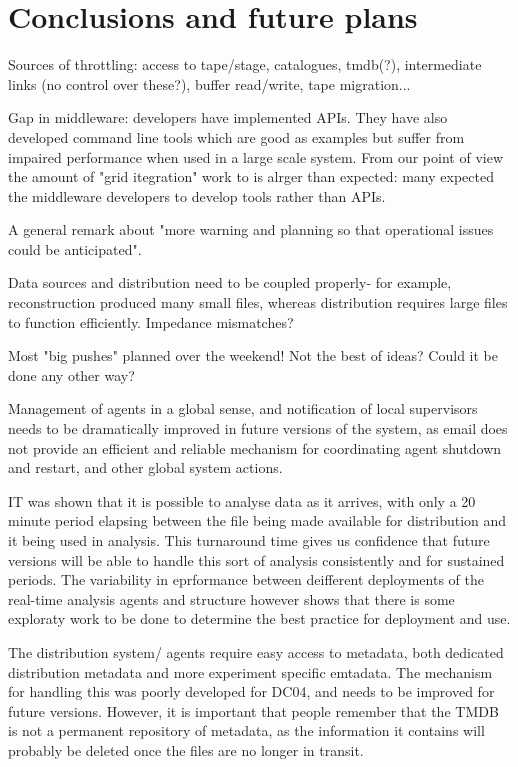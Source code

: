 \documentclass{cmspaper}
\begin{document}
\section{Conclusions and future plans}
Sources of throttling: access to tape/stage, catalogues, tmdb(?), intermediate links (no control over these?), buffer read/write, tape migration...

Gap in middleware: developers have implemented APIs. They have also developed command line tools which are good as examples but suffer from impaired performance when used in a large scale system. From our point of view the amount of "grid itegration" work to is alrger than expected: many expected the middleware developers to develop tools rather than APIs.

A general remark about "more warning and planning so that operational issues could be anticipated".

Data sources and distribution need to be coupled properly- for example, reconstruction produced many small files, whereas distribution requires large files to function efficiently. Impedance mismatches?

Most "big pushes" planned over the weekend! Not the best of ideas? Could it be done any other way?

Management of agents in a global sense, and notification of local supervisors needs to be dramatically improved in future versions of the system, as email does not provide an efficient and reliable mechanism for coordinating agent shutdown and restart, and other global system actions.

IT was shown that it is possible to analyse data as it arrives, with only a 20 minute period elapsing between the file being made available for distribution and it being used in analysis. This turnaround time gives us confidence that future versions will be able to handle this sort of analysis consistently and for sustained periods. The variability in eprformance between deifferent deployments of the real-time analysis agents and structure however shows that there is some exploraty work to be done to determine the best practice for deployment and use.

The distribution system/ agents require easy access to metadata, both dedicated distribution metadata and more experiment specific emtadata. The mechanism for handling this was poorly developed for DC04, and needs to be improved for future versions. However, it is important that people remember that the TMDB is not a permanent repository of metadata, as the information it contains will probably be deleted once the files are no longer in transit.
\end{document}
